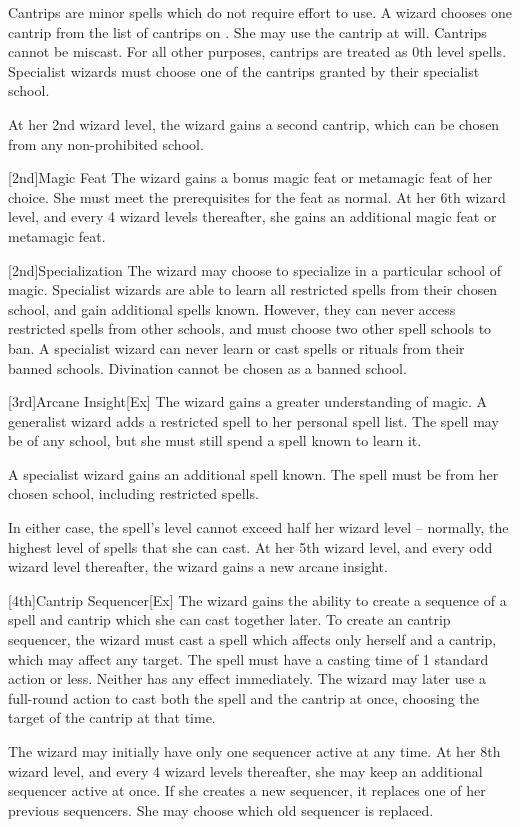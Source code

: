 Cantrips are minor spells which do not require effort to use.
A wizard chooses one cantrip from the list of cantrips on .
She may use the cantrip at will.
Cantrips cannot be miscast.
For all other purposes, cantrips are treated as 0th level spells.
Specialist wizards must choose one of the cantrips granted by their specialist school.

At her 2nd wizard level, the wizard gains a second cantrip, which can be chosen from any non-prohibited school.

[2nd]{Magic Feat}
The wizard gains a bonus magic feat or metamagic feat of her choice.
She must meet the prerequisites for the feat as normal.
At her 6th wizard level, and every 4 wizard levels thereafter, she gains an additional magic feat or metamagic feat.

[2nd]{Specialization}
The wizard may choose to specialize in a particular school of magic.
Specialist wizards are able to learn all restricted spells from their chosen school, and gain additional spells known.
However, they can never access restricted spells from other schools, and must choose two other spell schools to ban.
A specialist wizard can never learn or cast spells or rituals from their banned schools.
Divination cannot be chosen as a banned school.

[3rd]{Arcane Insight}[Ex]\label{Arcane Insight}
The wizard gains a greater understanding of magic.
A generalist wizard adds a restricted spell to her personal spell list.
The spell may be of any school, but she must still spend a spell known to learn it.

A specialist wizard gains an additional spell known.
The spell must be from her chosen school, including restricted spells.

In either case, the spell's level cannot exceed half her wizard level -- normally, the highest level of spells that she can cast.
At her 5th wizard level, and every odd wizard level thereafter, the wizard gains a new arcane insight.

[4th]{Cantrip Sequencer}[Ex]
The wizard gains the ability to create a sequence of a spell and cantrip which she can cast together later.
To create an cantrip sequencer, the wizard must cast a spell which affects only herself and a cantrip, which may affect any target.
The spell must have a casting time of 1 standard action or less.
Neither has any effect immediately.
The wizard may later use a full-round action to cast both the spell and the cantrip at once, choosing the target of the cantrip at that time.
\par The wizard may initially have only one sequencer active at any time.
At her 8th wizard level, and every 4 wizard levels thereafter, she may keep an additional sequencer active at once.
If she creates a new sequencer, it replaces one of her previous sequencers.
She may choose which old sequencer is replaced.

